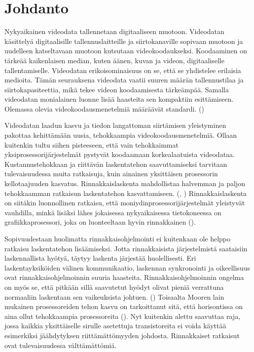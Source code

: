 
\section{Johdanto}

Nykyaikainen videodata tallennetaan digitaaliseen muotoon. Videodatan
käsittelyä digitaalisille tallennuslaitteille ja siirtokanaville sopivaan
muotoon ja uudelleen katseltavaan muotoon kutsutaan videokoodaukseksi.
Koodaaminen on tärkeää kaikenlaisen median, kuten äänen, kuvan ja videon,
digitaaliselle tallentamiselle. Videodatan erikoisominaisuus on se, että
se yhdistelee erilaisia medioita. Tämän seurauksena videodata vaatii suuren
määrän tallennustilaa ja siirtokapasiteettia, mikä tekee videon koodaamisesta
tärkeämpää. Samalla videodatan monialainen luonne lisää haasteita sen
kompaktiin esittämiseen. Olemassa olevia videokoodausmenetelmiä määräävät
standardi. (\citealt{h264})

Videodatan laadun kasvu ja tiedon langattoman siirtämisen yleistyminen pakottaa
kehittämään uusia, tehokkaampia videokoodausmenetelmiä. Ollaan kuitenkin tultu
siihen pisteeseen, että vain tehokkaimmat yksiprosessorijärjestelmät pystyvät
koodaamaan korkealaatuista videodataa. Kustannustehokkaan ja riittävän
laskentatehon saavuttamiseksi tarvitaan tulevaisuudessa muita ratkaisuja, kuin
ainainen yksittäisen prosessorin kellotaajuuden kasvatus. Rinnakkaislaskenta
mahdollistaa halvemman ja paljon tehokkaamman ratkaisun laskentatehon
kasvattamiseen. (\citealt{xu}, \citealt{chi}) Rinnakkaislaskenta on siitäkin
luonnollinen ratkaisu, että moniydinprosessorijärjestelmät yleistyvät
vauhdilla, minkä lisäksi lähes jokaisessa nykyaikaisessa tietokoneessa on
grafiikkaprosessori, joka on luonteeltaan hyvin rinnakkainen (\citealt{choi}).

Sopivuudestaan huolimatta rinnakkaisohjelmointi ei kuitenkaan ole helppo
ratkaisu laskentatehon lisäämiseksi. Jotta rinnakkaisista järjestelmistä
saataisiin laskennallista hyötyä, täytyy laskenta järjestää huolellisesti.
Eri laskentayksiköiden välinen kommunikaatio, laskennan synkronointi ja
oikeellisuus ovat rinnakkaisohjelmoinnin suuria haasteita.
Rinnakkaisohjelmoinnin ongelma on myös se, että pitkään sillä saavutetut hyödyt
olivat pieniä verrattuna normaaliin laskentaan sen vaikeuksista johtuen. (\citealt{intro})
Toisaalta Mooren lain mukainen prosessoreiden tehon kasvu on tarkoittanut sitä,
että horisontissa on aina ollut tehokkaampia prosessoreita (\citealt{moore}). Nyt kuitenkin
alettu saavuttaa raja, jossa kaikkia yksittäiselle sirulle asetettuja
transistoreita ei voida käyttää esimerkiksi jäähdytyksen riittämättömyyden
johdosta. Rinnakkaiset ratkaisut ovat tulevaisuudessa välttämättömiä.

